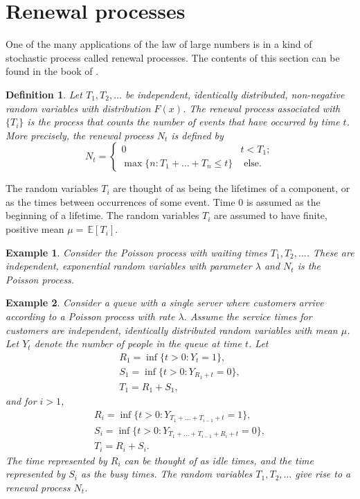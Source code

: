 \documentclass[letterpaper, 10 pt, conference]{article}
\newtheorem{exm}{Example}
\newtheorem{defn}{Definition}
\newcommand\expec[1]{\, \mathbb{E} \left\lbrack #1 \right\rbrack}
\begin{document}
\section{Renewal processes}
One of the many applications of the law of large numbers is in a kind of stochastic process called renewal processes. The contents of this section can be found in the book of \citet{lawler_2006}.

\begin{defn}
	Let $T_1, T_2, \dots$ be independent, identically distributed, non-negative random variables with distribution $F(x)$. The renewal process associated with $\lbrace T_i \rbrace$ is the process that counts the number of events that have occurred by time $t$. More precisely, the renewal process $N_t$ is defined by 
	\begin{equation}
		N_t = \begin{cases}
		0 & t < T_1; \\
		\max\lbrace n : T_1 + \dots + T_n \leq t\rbrace &  \text{ else.}
		\end{cases}
	\end{equation}
\end{defn}
The random variables $T_i$ are thought of as being the lifetimes of a component, or as the times between occurrences of some event. Time 0 is assumed as the beginning of a lifetime. The random variables $T_i$ are assumed to have finite, positive mean $\mu = \expec{T_i}$.

\begin{exm}\label{exm:poisson}
	Consider the Poisson process with waiting times $T_1, T_2, \dots$. These are independent, exponential random variables with parameter $\lambda$ and $N_t$ is the Poisson process.
\end{exm}

\begin{exm}\label{exm:queue}
Consider a queue with a single server where customers arrive according to a Poisson process with rate $\lambda$. Assume the service times for customers are independent, identically distributed random variables with mean $\mu$. Let $Y_t$ denote the number of people in the queue at time $t$.  Let 
\begin{align}
R_1 = \inf \lbrace t > 0 : Y_t = 1\rbrace, \\
S_1 = \inf\lbrace t > 0 : Y_{R_1 + t} = 0\rbrace, \\
T_1 = R_1 + S_1,
\end{align}
and for $i > 1$,
\begin{align}
R_i = \inf \lbrace t > 0 : Y_{T_1 + \dots + T_{i-1} +t} = 1\rbrace, \\
S_i = \inf\lbrace t > 0 : Y_{T_1 + \dots + T_{i-1} + R_i + t} = 0\rbrace, \\
T_i = R_i + S_i.
\end{align}
The time represented by $R_i$ can be thought of as idle times, and the time represented by $S_i$ as the busy times. The random variables $T_1, T_2, \dots$ give rise to a renewal process $N_t$. 
\end{exm}
\end{document}
